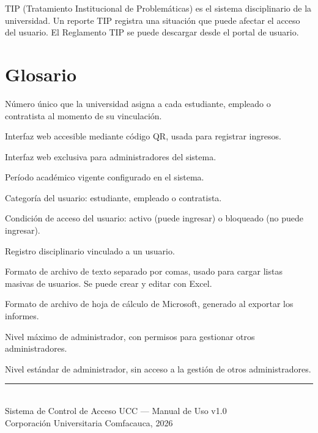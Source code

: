 \documentclass[12pt, a4paper]{article}
\begin{document}
TIP (Tratamiento Institucional de Problemáticas) es el sistema
disciplinario de la universidad. Un reporte TIP registra una situación
que puede afectar el acceso del usuario. El Reglamento TIP se puede
descargar desde el portal de usuario.

\section{Glosario}

\begin{description}[leftmargin=3.5cm, labelwidth=3cm, style=nextline]
  \item[ID institucional] Número único que la universidad asigna a cada
    estudiante, empleado o contratista al momento de su vinculación.
  \item[Portal de usuario] Interfaz web accesible mediante código QR,
    usada para registrar ingresos.
  \item[Panel de administración] Interfaz web exclusiva para
    administradores del sistema.
  \item[Semestre activo] Período académico vigente configurado en el sistema.
  \item[Rol] Categoría del usuario: estudiante, empleado o contratista.
  \item[Estado] Condición de acceso del usuario: activo (puede ingresar)
    o bloqueado (no puede ingresar).
  \item[Reporte TIP] Registro disciplinario vinculado a un usuario.
  \item[CSV] Formato de archivo de texto separado por comas, usado para
    cargar listas masivas de usuarios. Se puede crear y editar con Excel.
  \item[Excel (.xlsx)] Formato de archivo de hoja de cálculo de Microsoft,
    generado al exportar los informes.
  \item[Superadmin] Nivel máximo de administrador, con permisos para
    gestionar otros administradores.
  \item[Admin] Nivel estándar de administrador, sin acceso a la gestión
    de otros administradores.
\end{description}

\vspace{2cm}
\begin{center}
  {\color{uccazul}\rule{0.5\textwidth}{0.5pt}}\\[0.5em]
  {\small\color{uccgris}
    Sistema de Control de Acceso UCC — Manual de Uso v1.0 \\
    Corporación Universitaria Comfacauca, 2026
  }
\end{center}
\end{document}
